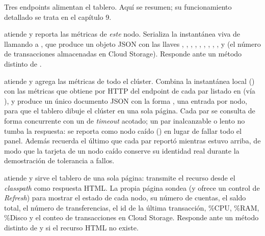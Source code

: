 Tres endpoints alimentan el tablero. Aquí se resumen; su funcionamiento detallado
se trata en el capítulo 9.

 atiende  y reporta las
métricas de \emph{este} nodo. Serializa la instantánea viva de
 llamando a , que produce un objeto JSON
con las llaves , , ,
, , ,
, , , 
y  (el número de transacciones almacenadas en Cloud Storage).
Responde  ante un método distinto de .

 atiende  y agrega las métricas
de todo el clúster. Combina la instantánea local () con las
métricas que obtiene por HTTP del endpoint  de cada par
listado en  (vía ), y produce un único
documento JSON con la forma , una entrada por nodo, para
que el tablero dibuje el clúster en una sola página. Cada par se consulta de forma
concurrente con un  de \emph{timeout} acotado; un par
inalcanzable o lento no tumba la respuesta: se reporta como nodo caído
() en lugar de fallar todo el panel. Además recuerda el
último  que cada par reportó mientras estuvo arriba, de modo que la
tarjeta de un nodo caído conserve su identidad real durante la demostración de
tolerancia a fallos.

 atiende  y sirve el tablero de
una sola página: transmite el recurso  desde el
\emph{classpath} como respuesta HTML. La propia página sondea  (y
ofrece un control de \emph{Refresh}) para mostrar el estado de cada nodo, su
número de cuentas, el saldo total, el número de transferencias, el id de la
última transacción, \%CPU, \%RAM, \%Disco y el conteo de transacciones en Cloud
Storage. Responde  ante un método distinto de  y
 si el recurso HTML no existe.

